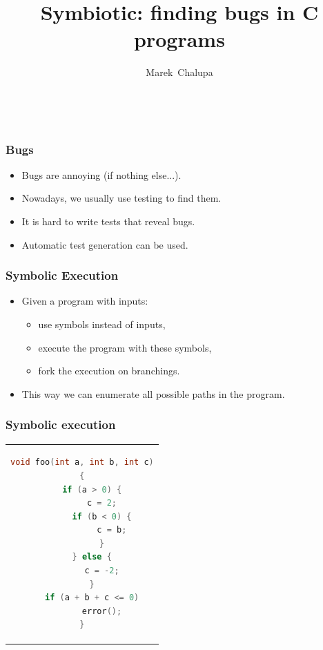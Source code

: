 \documentclass[sans]{beamer}
\title{\fontsize{0.905em}{1.5em}\selectfont Symbiotic: finding bugs in C programs}
\author{
 {Marek~Chalupa}
 }
\institute {DevConf 2019 , 25. 1. 2019}
\date{~\\[1cm]}
\begin{document}
\maketitle

\begin{frame}
\frametitle{Bugs}
\begin{itemize}
  \item Bugs are annoying (if nothing else...).
  \item Nowadays, we usually use testing to find them.
  \item It is hard to write tests that reveal bugs.
  \item Automatic test generation can be used.
\end{itemize}
\end{frame}


\begin{frame}
\frametitle{Symbolic Execution}
\begin{itemize}
  \item Given a program with inputs:
  \begin{itemize}
    \item use symbols instead of inputs,
    \item execute the program with these symbols,
    \item fork the execution on branchings.
  \end{itemize}
  \item This way we can enumerate all possible paths in the program.
\end{itemize}
\end{frame}

\begin{frame}[fragile]
\frametitle{Symbolic execution}
\begin{center}
\begin{tabular}{c}
\begin{lstlisting}[language=C]
void foo(int a, int b, int c)
{
    if (a > 0) {
        c = 2;
        if (b < 0) {
            c = b;
        }
    } else {
        c = -2;
    }
    if (a + b + c <= 0)
        error();
}
\end{lstlisting}
\end{tabular}
\end{center}
\end{frame}
\end{document}
